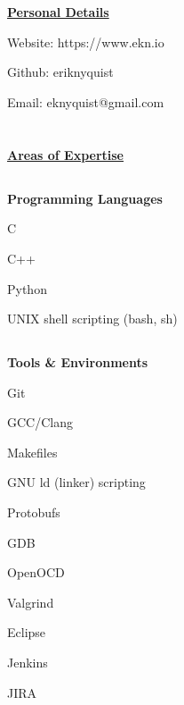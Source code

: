 \documentclass[6pt]{article}
\begin{document}
%
%
\hspace*{-\parindent}%
\begin{minipage}[t]{15em}
\section*{}
{\underline{\textbf{Personal Details}}}
\break

{\small Website: https://www.ekn.io

Github: eriknyquist

Email: eknyquist@gmail.com}

\section*{}
{\underline{\textbf{Areas of Expertise}}}
\subsection*{}
{\textbf{Programming Languages}}

{\small C

C++

Python

UNIX shell scripting (bash, sh)}

\subsection*{}
{\textbf{Tools \& Environments}}

{\small Git

GCC/Clang

Makefiles

GNU ld (linker) scripting

Protobufs

GDB

OpenOCD

Valgrind

Eclipse

Jenkins

JIRA}

\end{minipage}
%
%
\end{document}
